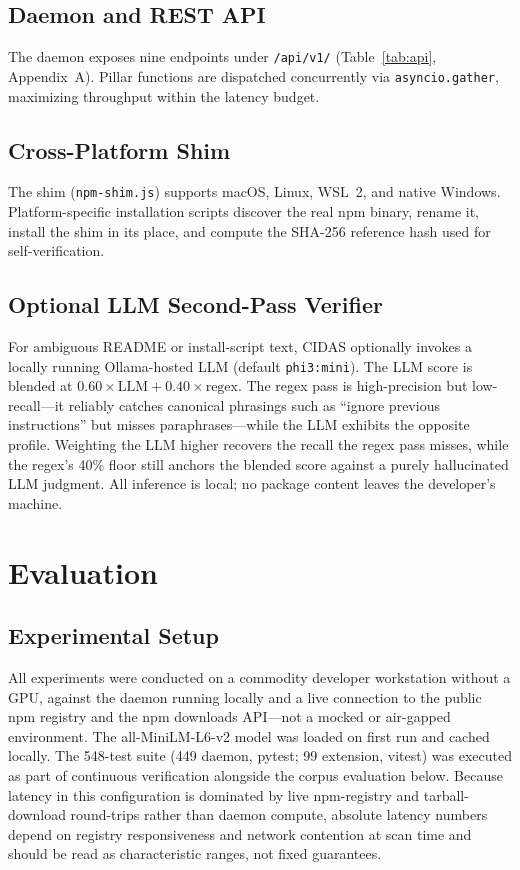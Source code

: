 \documentclass[journal]{IEEEtran}
\begin{document}
\subsection{Daemon and REST API}
The daemon exposes nine endpoints under \texttt{/api/v1/} (Table~\ref{tab:api}, Appendix~A). Pillar functions
are dispatched concurrently via \texttt{asyncio.gather}, maximizing throughput within the latency budget.

\subsection{Cross-Platform Shim}
The shim (\texttt{npm-shim.js}) supports macOS, Linux, WSL~2, and native Windows. Platform-specific
installation scripts discover the real npm binary, rename it, install the shim in its place, and compute the
SHA-256 reference hash used for self-verification.

\subsection{Optional LLM Second-Pass Verifier}
For ambiguous README or install-script text, CIDAS optionally invokes a locally running Ollama-hosted LLM
(default \texttt{phi3:mini}). The LLM score is blended at $0.60 \times \text{LLM} + 0.40 \times \text{regex}$.
The regex pass is high-precision but low-recall---it reliably catches canonical phrasings such as ``ignore
previous instructions'' but misses paraphrases---while the LLM exhibits the opposite profile. Weighting the
LLM higher recovers the recall the regex pass misses, while the regex's 40\% floor still anchors the blended
score against a purely hallucinated LLM judgment. All inference is local; no package content leaves the
developer's machine.

\section{Evaluation}

\subsection{Experimental Setup}
All experiments were conducted on a commodity developer workstation without a GPU, against the daemon
running locally and a live connection to the public npm registry and the npm downloads API---not a mocked
or air-gapped environment. The all-MiniLM-L6-v2 model was loaded on first run and cached locally. The
548-test suite (449 daemon, pytest; 99 extension, vitest) was executed as part of continuous verification
alongside the corpus evaluation below. Because latency in this configuration is dominated by live
npm-registry and tarball-download round-trips rather than daemon compute, absolute latency numbers depend on
registry responsiveness and network contention at scan time and should be read as characteristic ranges, not
fixed guarantees.
\end{document}
